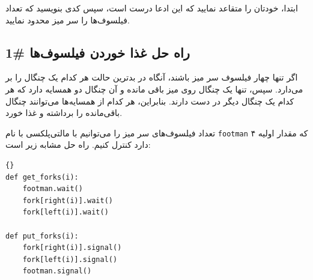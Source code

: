 \documentclass{book}
\newcommand{\clearemptydoublepage}{\newpage\cleardoublepage}
\begin{document}
    ابتدا، خودتان را متقاعد نمایید که این ادعا درست است، سپس کدی بنویسید که تعداد فیلسوف‌ها را سر میز محدود نمایید. 


\clearemptydoublepage
\subsection{راه حل غذا خوردن فیلسوف‌ها  \#1}

    اگر تنها چهار فیلسوف سر میز باشند، آنگاه در بدترین حالت هر کدام یک چنگال را بر می‌دارد. سپس، تنها یک چنگال روی میز باقی‌ مانده و 
    آن چنگال دو همسایه دارد که هر کدام یک چنگال دیگر در دست دارند. بنابراین، هر کدام از همسایه‌ها می‌توانند چنگال باقی‌مانده را برداشته و غذا خورد. 

    تعداد فیلسوف‌های سر میز را می‌توانیم با مالتی‌پلکسی با نام {\tt footman} که مقدار اولیه ۴ دارد کنترل کنیم. 
    راه حل مشابه زیر است: 

\begin{latin}
\begin{latin}
\begin{lstlisting}[title=\rl{راه حل غذا خوردن فیلسوف‌ها \#1}]{}
def get_forks(i):
    footman.wait()
    fork[right(i)].wait()
    fork[left(i)].wait()

def put_forks(i):
    fork[right(i)].signal()
    fork[left(i)].signal()
    footman.signal()
\end{lstlisting}
\end{latin}
\end{latin}
\end{document}
